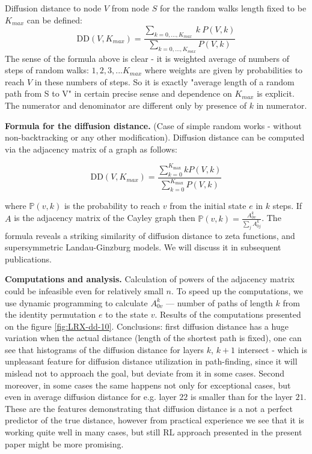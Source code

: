 \documentclass[reqno,11pt]{amsart}
\begin{document}
 Diffusion distance to node $V$ from node $S$ for the random walks length fixed to be  $K_{max}$ can be defined:
\begin{equation}
    \mathrm{DD}(V,K_{max}) = \frac{\sum_{k=0,...,K_{max} } ~  k ~  P(V,k)  }{\sum_{k=0,...,K_{max} }  P(V,k)}
\end{equation}
The sense of the formula above is clear -  it is weighted average of numbers of steps of random walks: $1,2,3,...K_{max}$ where weights are given by probabilities to reach $V$ in these numbers of steps. So it is exactly "average length of a random path from S to V" in certain precise sense and dependence on $K_{max}$ is explicit. The numerator and denominator are different only by presence  of $k$ in numerator. 



{\bf Formula for the diffusion distance. } (Case of simple random works - without non-backtracking or any other modification). 
Diffusion distance %
can be computed via the adjacency matrix of a graph as follows: 

\begin{equation}
    \label{eq:dd}
    \mathrm{DD}(V,K_{max} ) = \frac{\sum\limits_{k=0}^{K_{\max}} k  P(V, k)}{\sum\limits_{k=0}^{K_{\max}}   P(V, k)}
\end{equation}
    
\noindent
where $\mathbb P(v, k)$ is the probability to reach $v$ from the initial state $e$ in $k$ steps. If $A$ is the adjacency matrix of the Cayley graph then $\mathbb P(v, k) = \frac{A^k_{0v}}{\sum\limits_j A^k_{0j}}$. 
The formula reveals a striking similarity of diffusion distance to zeta functions, and supersymmetric Landau-Ginzburg models. We will discuss it in subsequent publications. 

{\bf Computations and analysis. } 
Calculation of powers of the adjacency matrix could be infeasible even for relatively small $n$. To speed up the computations, we use dynamic programming to calculate $A^k_{0v}$ --- number of paths of length $k$ from the identity permutation $e$ to the state $v$.
Results of the computations presented on the figure \ref{fig:LRX-dd-10}.
Conclusions: first diffusion distance has a huge variation when the actual distance (length of the shortest path is fixed),
one can see that histograms of the diffusion distance for layers $k$, $k+1$ intersect - which is unpleasant feature for diffusion
distance utilization in path-finding, since it will mislead  not to approach the goal, but deviate from it in some cases.
Second moreover, in some cases the same happens  not only for exceptional cases, but even in average diffusion distance 
for e.g. layer $22$ is smaller than for the layer $21$. 
These are the features demonstrating that diffusion distance is a not a perfect predictor of the true distance,
however from practical experience we see that it is working quite well in many cases, but still RL approach presented in the present paper
might be more promising. 
\end{document}
